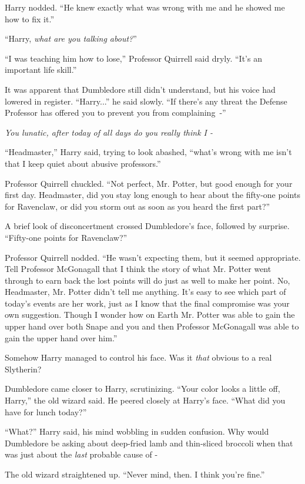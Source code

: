 Harry nodded. ``He knew exactly what was wrong with me and he showed me how to fix it.''

``Harry, \emph{what are you talking about?}''

``I was teaching him how to lose,'' Professor Quirrell said dryly. ``It's an important life skill.''

It was apparent that Dumbledore still didn't understand, but his voice had lowered in register. ``Harry...'' he said slowly. ``If there's any threat the Defense Professor has offered you to prevent you from complaining~-''

\emph{You lunatic, after today of all days do you really think I -}

``Headmaster,'' Harry said, trying to look abashed, ``what's wrong with me isn't that I keep quiet about abusive professors.''

Professor Quirrell chuckled. ``Not perfect, Mr. Potter, but good enough for your first day. Headmaster, did you stay long enough to hear about the fifty-one points for Ravenclaw, or did you storm out as soon as you heard the first part?''

A brief look of disconcertment crossed Dumbledore's face, followed by surprise. ``Fifty-one points for Ravenclaw?''

Professor Quirrell nodded. ``He wasn't expecting them, but it seemed appropriate. Tell Professor McGonagall that I think the story of what Mr. Potter went through to earn back the lost points will do just as well to make her point. No, Headmaster, Mr. Potter didn't tell me anything. It's easy to see which part of today's events are her work, just as I know that the final compromise was your own suggestion. Though I wonder how on Earth Mr. Potter was able to gain the upper hand over both Snape and you and then Professor McGonagall was able to gain the upper hand over him.''

Somehow Harry managed to control his face. Was it \emph{that} obvious to a real Slytherin?

Dumbledore came closer to Harry, scrutinizing. ``Your color looks a little off, Harry,'' the old wizard said. He peered closely at Harry's face. ``What did you have for lunch today?''

``What?'' Harry said, his mind wobbling in sudden confusion. Why would Dumbledore be asking about deep-fried lamb and thin-sliced broccoli when that was just about the \emph{last} probable cause of -

The old wizard straightened up. ``Never mind, then. I think you're fine.''

